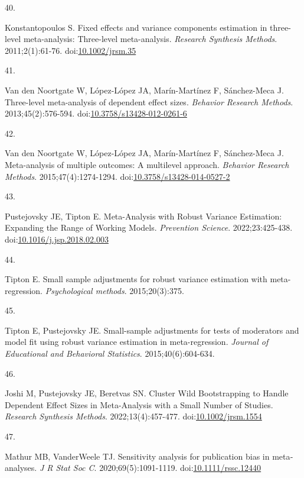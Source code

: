 \documentclass[
  american,
  man, donotrepeattitle,floatsintext]{apa7}
\newlength{\cslhangindent}
\newlength{\csllabelwidth}
\newenvironment{CSLReferences}[2] %
 {\begin{list}{}{%
  \setlength{\itemindent}{0pt}
  \setlength{\leftmargin}{0pt}
  \setlength{\parsep}{0pt}
  \ifodd #1
   \setlength{\leftmargin}{\cslhangindent}
   \setlength{\itemindent}{-1\cslhangindent}
  \fi
  \setlength{\itemsep}{#2\baselineskip}}}
 {\end{list}}
\newcommand{\CSLLeftMargin}[1]{\parbox[t]{\csllabelwidth}{\strut#1\strut}}
\newcommand{\CSLRightInline}[1]{\parbox[t]{\linewidth - \csllabelwidth}{\strut#1\strut}}
\begin{document}
\begin{CSLReferences}{0}{1}
\CSLLeftMargin{40. }%
\CSLRightInline{Konstantopoulos S. Fixed effects and variance components estimation in three-level meta-analysis: {Three}-level meta-analysis. \emph{Research Synthesis Methods}. 2011;2(1):61-76. doi:\href{https://doi.org/10.1002/jrsm.35}{10.1002/jrsm.35}}

\CSLLeftMargin{41. }%
\CSLRightInline{Van den Noortgate W, López-López JA, Marín-Martínez F, Sánchez-Meca J. Three-level meta-analysis of dependent effect sizes. \emph{Behavior Research Methods}. 2013;45(2):576-594. doi:\href{https://doi.org/10.3758/s13428-012-0261-6}{10.3758/s13428-012-0261-6}}

\CSLLeftMargin{42. }%
\CSLRightInline{Van den Noortgate W, López-López JA, Marín-Martínez F, Sánchez-Meca J. Meta-analysis of multiple outcomes: A multilevel approach. \emph{Behavior Research Methods}. 2015;47(4):1274-1294. doi:\href{https://doi.org/10.3758/s13428-014-0527-2}{10.3758/s13428-014-0527-2}}

\CSLLeftMargin{43. }%
\CSLRightInline{Pustejovsky JE, Tipton E. Meta-Analysis with Robust Variance Estimation: {Expanding} the Range of Working Models. \emph{Prevention Science}. 2022;23:425-438. doi:\href{https://doi.org/10.1016/j.jsp.2018.02.003}{10.1016/j.jsp.2018.02.003}}

\CSLLeftMargin{44. }%
\CSLRightInline{Tipton E. Small sample adjustments for robust variance estimation with meta-regression. \emph{Psychological methods}. 2015;20(3):375.}

\CSLLeftMargin{45. }%
\CSLRightInline{Tipton E, Pustejovsky JE. Small-sample adjustments for tests of moderators and model fit using robust variance estimation in meta-regression. \emph{Journal of Educational and Behavioral Statistics}. 2015;40(6):604-634.}

\CSLLeftMargin{46. }%
\CSLRightInline{Joshi M, Pustejovsky JE, Beretvas SN. Cluster Wild Bootstrapping to Handle Dependent Effect Sizes in Meta-Analysis with a Small Number of Studies. \emph{Research Synthesis Methods}. 2022;13(4):457-477. doi:\href{https://doi.org/10.1002/jrsm.1554}{10.1002/jrsm.1554}}

\CSLLeftMargin{47. }%
\CSLRightInline{Mathur MB, VanderWeele TJ. Sensitivity analysis for publication bias in meta‐analyses. \emph{J R Stat Soc C}. 2020;69(5):1091-1119. doi:\href{https://doi.org/10.1111/rssc.12440}{10.1111/rssc.12440}}


\end{CSLReferences}
\end{document}
